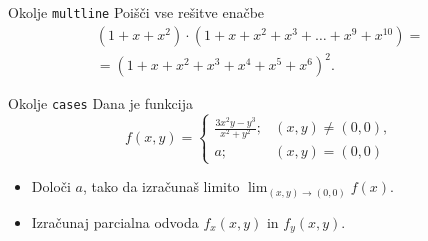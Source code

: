 \begin{frame}{Okolje \texttt{multline}}
	Poišči vse rešitve enačbe
	\begin{multline}
	(1+x+x^2) \cdot (1+x+x^2+x^3+\ldots+x^9+x^{10}) = \\
	=(1+x+x^2+x^3+x^4+x^5+x^6)^2.
	\end{multline}
\end{frame}

\begin{frame}{Okolje \texttt{cases}}
	Dana je funkcija
	$$
		f(x,y) =
		\begin{cases}
			\frac{3x^2y-y^3}{x^2+y^2}; & (x,y) \ne (0, 0),\\
			a; & (x,y) = (0,0)
		\end{cases}
	$$	
	\begin{itemize}
	\item Določi $a$, tako da izračunaš limito \( \lim_{(x,y)\to(0,0)} f(x). \)
	\item Izračunaj parcialna odvoda $f_x(x,y)$ in $f_y(x,y)$.
	\end{itemize}
\end{frame}
